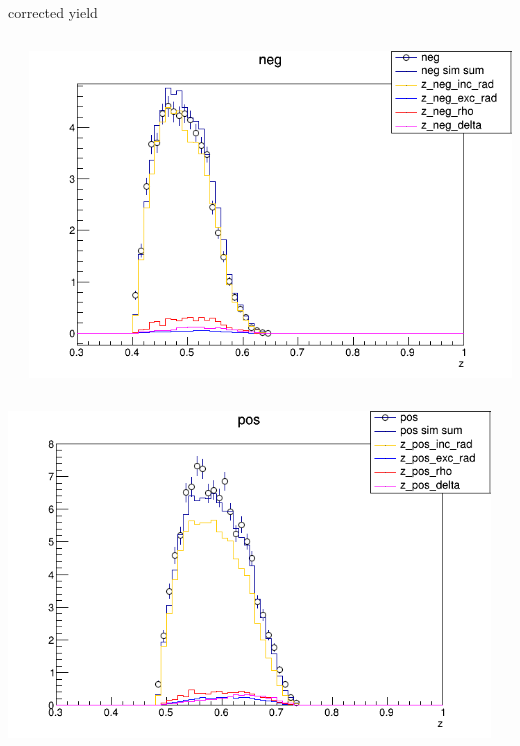 \begin{frame}{corrected yield}
\begin{columns}
\begin{column}[T]{0.25\textwidth}
\end{column}
\begin{column}[T]{0.25\textwidth}
\includegraphics[width = \textwidth]{results/yield/statistics_corr/yield_x_Q2_z_0.60_4.775_0.50_neg.png}
\end{column}
\end{columns}
\begin{columns}
\begin{column}[T]{0.25\textwidth}
\includegraphics[width = \textwidth]{results/yield/statistics_corr/yield_x_Q2_z_0.60_4.775_0.60_pos.png}
\end{column}
\begin{column}[T]{0.25\textwidth}

\end{column}
\end{columns}
\end{frame}
